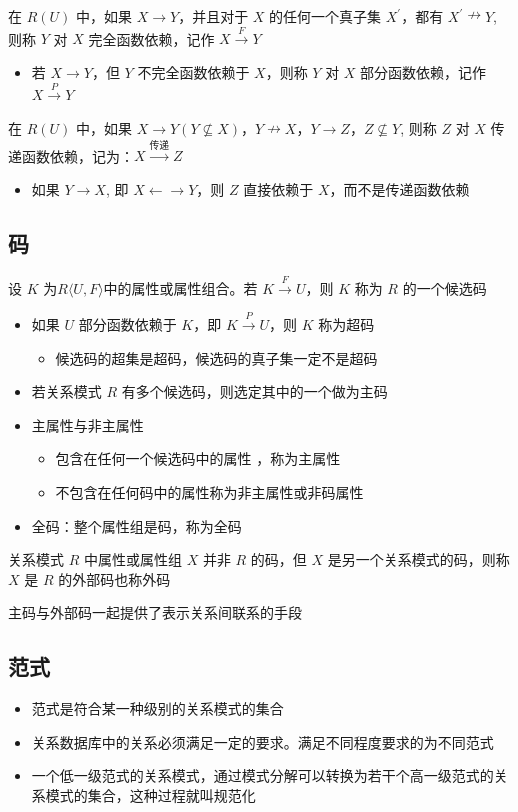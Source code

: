 在 $R(U)$ 中，如果 $X \to Y$，并且对于 $X$ 的任何一个真子集 $X ^\prime$，都有 $X^\prime \nrightarrow  Y$, 则称 $Y$ 对 $X$ 完全函数依赖，记作 $X \stackrel{F}{\longrightarrow} Y$
\begin{itemize}
    \item 若 $X \to Y$，但 $Y$ 不完全函数依赖于 $X$，则称 $Y$ 对 $X$ 部分函数依赖，记作 $X \stackrel{P}{\longrightarrow} Y$
\end{itemize}

在 $R(U)$ 中，如果 $X \to Y(Y\not\subseteq X )$，$Y \nrightarrow  X$，$Y\to Z$，$Z\not\subseteq Y$, 则称 $Z$ 对 $X$ 传递函数依赖，记为：$X\stackrel{\mbox{传递}}{\longrightarrow} Z$
\begin{itemize}
    \item 如果 $Y\to X$, 即 $X\leftarrow \to Y$，则 $Z$ 直接依赖于 $X$，而不是传递函数依赖
\end{itemize}

\subsection{码}
设 $K$ 为$R\langle U,F\rangle$中的属性或属性组合。若 $K \stackrel{F}{\longrightarrow} U$，则 $K$ 称为 $R$ 的一个候选码
\begin{itemize}
    \item 如果 $U$ 部分函数依赖于 $K$，即 $K \stackrel{P}{\longrightarrow} U$，则 $K$ 称为超码
    \begin{itemize}
        \item 候选码的超集是超码，候选码的真子集一定不是超码
    \end{itemize}
    \item 若关系模式 $R$ 有多个候选码，则选定其中的一个做为主码
    \item 主属性与非主属性
    \begin{itemize}
        \item 包含在任何一个候选码中的属性 ，称为主属性
        \item 不包含在任何码中的属性称为非主属性或非码属性
    \end{itemize}
    \item 全码：整个属性组是码，称为全码
\end{itemize}

关系模式 $R$ 中属性或属性组 $X$ 并非 $R$ 的码，但 $X$ 是另一个关系模式的码，则称 $X$ 是 $R$ 的外部码也称外码

主码与外部码一起提供了表示关系间联系的手段

\subsection{范式}
\begin{itemize}
    \item 范式是符合某一种级别的关系模式的集合
    \item 关系数据库中的关系必须满足一定的要求。满足不同程度要求的为不同范式
    \item 一个低一级范式的关系模式，通过模式分解可以转换为若干个高一级范式的关系模式的集合，这种过程就叫规范化
\end{itemize}


